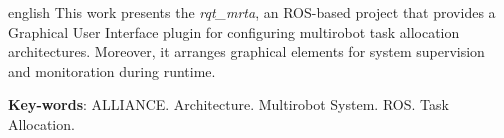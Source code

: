 \begin{resumo}[Abstract]
    \begin{otherlanguage*}{english}
        This work presents the \textit{rqt\_mrta}, an ROS-based project that provides a Graphical User Interface plugin for configuring multirobot task allocation architectures. Moreover, it arranges graphical elements for system supervision and monitoration during runtime. 
        
        \vspace{\onelineskip}
        
        \noindent 
        \textbf{Key-words}: ALLIANCE. Architecture. Multirobot System. ROS. Task Allocation. 
    \end{otherlanguage*}
\end{resumo}
\newpage